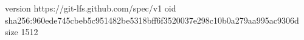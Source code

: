 version https://git-lfs.github.com/spec/v1
oid sha256:960ede745cbeb5c951482be5318bff6f3520037e298c10b0a279aa995ac9306d
size 1512
